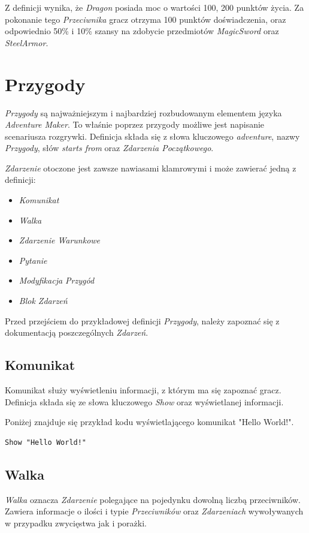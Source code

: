 \documentclass[openright]{xmgr}
\begin{document}
Z definicji wynika, że \textit{Dragon} posiada moc o wartości 100, 200 punktów życia. Za pokonanie tego \textit{Przeciwnika} gracz otrzyma 100 punktów doświadczenia, oraz odpowiednio 50\% i 10\% szansy na zdobycie przedmiotów \textit{MagicSword} oraz \textit{SteelArmor}.

\section{Przygody}
\textit{Przygody} są najważniejszym i najbardziej rozbudowanym elementem języka \textit{Adventure Maker}. To właśnie poprzez przygody możliwe jest napisanie scenariusza rozgrywki. Definicja składa się z słowa kluczowego \textit{adventure}, nazwy \textit{Przygody}, słów \textit{starts from} oraz \textit{Zdarzenia Początkowego}.

\textit{Zdarzenie} otoczone jest zawsze nawiasami klamrowymi i może zawierać jedną z definicji:
\begin{itemize}
	\item \textit{Komunikat}
	\item \textit{Walka}
	\item \textit{Zdarzenie Warunkowe}
	\item \textit{Pytanie}
	\item \textit{Modyfikacja Przygód}
	\item \textit{Blok Zdarzeń}
\end{itemize}

Przed przejściem do przykładowej definicji \textit{Przygody}, należy zapoznać się z dokumentacją poszczególnych \textit{Zdarzeń}.
\subsection{Komunikat}
Komunikat służy wyświetleniu informacji, z którym ma się zapoznać gracz. Definicja składa się ze słowa kluczowego \textit{Show} oraz wyświetlanej informacji.

Poniżej znajduje się przykład kodu wyświetlającego komunikat "Hello World!".
\begin{verbatim}
Show "Hello World!"
\end{verbatim}

\subsection{Walka}
\textit{Walka} oznacza \textit{Zdarzenie} polegające na pojedynku dowolną liczbą przeciwników. Zawiera informacje o ilości i typie \textit{Przeciwników} oraz \textit{Zdarzeniach} wywoływanych w przypadku zwycięstwa jak i porażki.
\end{document}
